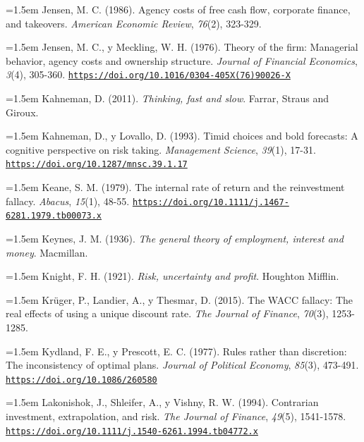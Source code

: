 \documentclass[10pt,a4paper]{article}
\begin{document}
\noindent\hangindent=1.5em Jensen, M. C. (1986). Agency costs of free cash flow, corporate finance, and takeovers. \textit{American Economic Review}, \textit{76}(2), 323-329.

\noindent\hangindent=1.5em Jensen, M. C., y Meckling, W. H. (1976). Theory of the firm: Managerial behavior, agency costs and ownership structure. \textit{Journal of Financial Economics}, \textit{3}(4), 305-360. \href{https://doi.org/10.1016/0304-405X(76)90026-X}{\nolinkurl{https://doi.org/10.1016/0304-405X(76)90026-X}}

\noindent\hangindent=1.5em Kahneman, D. (2011). \textit{Thinking, fast and slow}. Farrar, Straus and Giroux.

\noindent\hangindent=1.5em Kahneman, D., y Lovallo, D. (1993). Timid choices and bold forecasts: A cognitive perspective on risk taking. \textit{Management Science}, \textit{39}(1), 17-31. \href{https://doi.org/10.1287/mnsc.39.1.17}{\nolinkurl{https://doi.org/10.1287/mnsc.39.1.17}}

\noindent\hangindent=1.5em Keane, S. M. (1979). The internal rate of return and the reinvestment fallacy. \textit{Abacus}, \textit{15}(1), 48-55. \href{https://doi.org/10.1111/j.1467-6281.1979.tb00073.x}{\nolinkurl{https://doi.org/10.1111/j.1467-6281.1979.tb00073.x}}

\noindent\hangindent=1.5em Keynes, J. M. (1936). \textit{The general theory of employment, interest and money}. Macmillan.

\noindent\hangindent=1.5em Knight, F. H. (1921). \textit{Risk, uncertainty and profit}. Houghton Mifflin.

\noindent\hangindent=1.5em Krüger, P., Landier, A., y Thesmar, D. (2015). The WACC fallacy: The real effects of using a unique discount rate. \textit{The Journal of Finance}, \textit{70}(3), 1253-1285.

\noindent\hangindent=1.5em Kydland, F. E., y Prescott, E. C. (1977). Rules rather than discretion: The inconsistency of optimal plans. \textit{Journal of Political Economy}, \textit{85}(3), 473-491. \href{https://doi.org/10.1086/260580}{\nolinkurl{https://doi.org/10.1086/260580}}

\noindent\hangindent=1.5em Lakonishok, J., Shleifer, A., y Vishny, R. W. (1994). Contrarian investment, extrapolation, and risk. \textit{The Journal of Finance}, \textit{49}(5), 1541-1578. \href{https://doi.org/10.1111/j.1540-6261.1994.tb04772.x}{\nolinkurl{https://doi.org/10.1111/j.1540-6261.1994.tb04772.x}}
\end{document}
